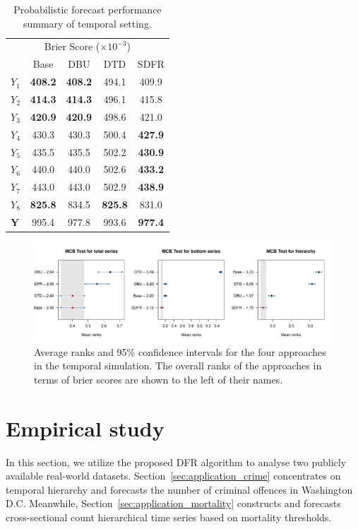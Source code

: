 \documentclass[a4paper,review,12pt,authoryear]{elsarticle}
\newcommand{\bY}{\mathbf{Y}}
\begin{document}
     \begin{table}
     \centering
     \caption{\label{tab:sim_temporal_res_dist} Probabilistic forecast performance summary of temporal setting.}
     \begin{tabular}{lcccc}
     \toprule
     \multicolumn{5}{c}{Brier Score ($\times 10^{-3}$)}\\ 
      & Base & DBU & DTD & SDFR \\\midrule
     $Y_1$ & \textbf{408.2} & \textbf{408.2} & 494.1 & 409.9 \\
     $Y_2$ & \textbf{414.3} & \textbf{414.3} & 496.1 & 415.8\\
     $Y_3$ & \textbf{420.9} & \textbf{420.9} & 498.6 & 421.0\\
     $Y_4$ & 430.3 & 430.3  & 500.4          & \textbf{427.9}\\
     $Y_5$ & 435.5 & 435.5  & 502.2          & \textbf{430.9} \\
     $Y_6$ & 440.0 & 440.0  & 502.6          & \textbf{433.2} \\
     $Y_7$ & 443.0 & 443.0  & 502.9          & \textbf{438.9} \\
     $Y_8$ & \textbf{825.8} & 834.5          & \textbf{825.8} & 831.0\\
     $\bY$ & 995.4 & 977.8  & 993.6          & \textbf{977.4} \\
     \bottomrule
     \end{tabular}
     \end{table}
     
     
     \begin{figure}
       \caption{\label{fig:sim_temporal_mcb_prob}Average ranks and 95\% confidence intervals for the four approaches in the temporal simulation. The overall ranks of the approaches in terms of brier scores are shown to the left of their names.}
       \includegraphics[width=\textwidth]{figures/temporal_mcb.pdf}
     \end{figure}     

     \section{Empirical study}
     \label{sec:application}
     In this section, we utilize the proposed DFR algorithm to analyse two publicly available real-world datasets.
     Section~\ref{sec:application_crime} concentrates on temporal hierarchy and forecasts the number of criminal offences in Washington D.C. 
     Meanwhile, Section~\ref{sec:application_mortality} constructs and forecasts cross-sectional count hierarchical time series based on mortality thresholds. 
     
\end{document}
